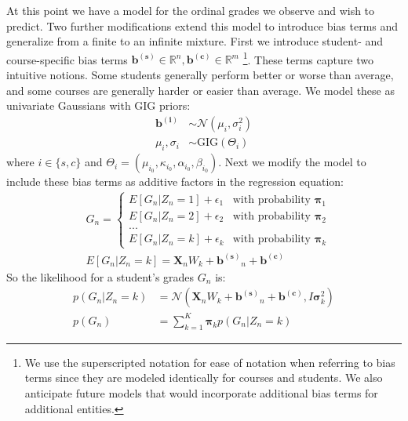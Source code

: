 \documentclass[10pt]{proc}
\begin{document}
At this point we have a model for the ordinal grades we observe and
wish to predict. Two further modifications extend this model to introduce bias
terms and generalize from a finite to an infinite mixture. First we introduce
student- and course-specific bias terms $\bm{b^{(s)}} \in \mathbb{R}^n,
\bm{b^{(c)}} \in \mathbb{R}^m$ \footnote{We use the superscripted notation for
ease of notation when referring to bias terms since they are modeled
identically for courses and students. We also anticipate future models that
would incorporate additional bias terms for additional entities.}.
These terms capture two intuitive notions. Some students generally perform
better or worse than average, and some courses are generally harder or easier
than average. We model these as univariate Gaussians with GIG priors:
%
\begin{align}
    \bm{b^{(i)}} &\sim \mathcal{N}(\mu_i, \sigma_i^2)  \\
    \mu_i, \sigma_i &\sim \text{GIG}(\Theta_i)
\end{align}
%
where $i \in \{s, c\}$ and $\Theta_i = (\mu_{i_0}, \kappa_{i_0}, \alpha_{i_0},
\beta_{i_0})$. Next we modify the model to include these bias terms as additive
factors in the regression equation:
%
\begin{align}
    &G_n =
    \begin{cases}
        E[G_n | Z_n = 1] + \epsilon_1  &  \text{with probability } \bm{\pi}_1  \\
        E[G_n | Z_n = 2] + \epsilon_2  &  \text{with probability } \bm{\pi}_2  \\
        ...                            &                                       \\
        E[G_n | Z_n = k] + \epsilon_k  &  \text{with probability } \bm{\pi}_k
    \end{cases}  \\
    &E[G_n | Z_n = k] = \bm{X}_n W_k + \bm{b^{(s)}}_n + \bm{b^{(c)}}
\end{align}
%
So the likelihood for a student's grades $G_n$ is:
%
\begin{align}
    p(G_n | Z_n = k) &=
        \mathcal{N}(
            \bm{X}_n W_k + \bm{b^{(s)}}_n + \bm{b^{(c)}}, I \bm{\sigma}_k^2)  \\
    p(G_n) &= \sum_{k=1}^K \bm{\pi}_k p(G_n | Z_n = k)
\end{align}
\end{document}

